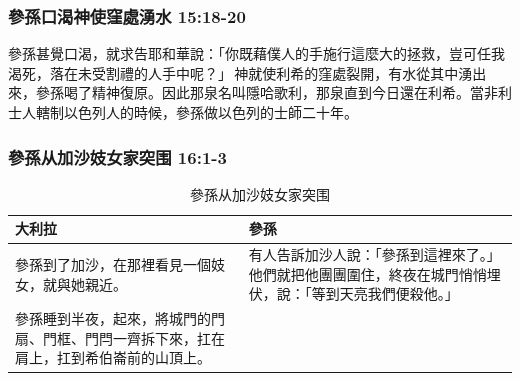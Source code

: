 \subsubsection{參孫口渴神使窪處湧水 15:18-20}
參孫甚覺口渴，就求告耶和華說：「你既藉僕人的手施行這麼大的拯救，豈可任我渴死，落在未受割禮的人手中呢？」 神就使利希的窪處裂開，有水從其中湧出來，參孫喝了精神復原。因此那泉名叫隱哈歌利，那泉直到今日還在利希。當非利士人轄制以色列人的時候，參孫做以色列的士師二十年。

\subsubsection{參孫从加沙妓女家突围 16:1-3}
\begin{table}[H]
\centering
\begin{tabular}{p{8cm}|p{}}\hline
大利拉&參孫\\\hline
參孫到了加沙，在那裡看見一個妓女，就與她親近。&有人告訴加沙人說：「參孫到這裡來了。」他們就把他團團圍住，終夜在城門悄悄埋伏，說：「等到天亮我們便殺他。」\\\hline
參孫睡到半夜，起來，將城門的門扇、門框、門閂一齊拆下來，扛在肩上，扛到希伯崙前的山頂上。&\\\hline
 \end{tabular}
\caption{參孫从加沙妓女家突围}
\end{table}  



